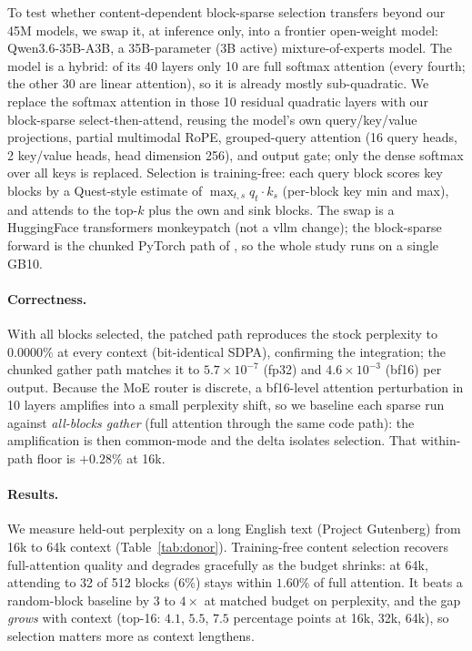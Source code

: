 \documentclass[10pt,letterpaper]{article}
\begin{document}
To test whether content-dependent block-sparse selection transfers beyond our 45M
models, we swap it, at inference only, into a frontier open-weight model:
Qwen3.6-35B-A3B, a 35B-parameter (3B active) mixture-of-experts model. The model is
a hybrid: of its 40 layers only 10 are full softmax attention (every fourth; the
other 30 are linear attention), so it is already mostly sub-quadratic. We replace
the softmax attention in those 10 residual quadratic layers with our block-sparse
select-then-attend, reusing the model's own query/key/value projections, partial
multimodal RoPE, grouped-query attention (16 query heads, 2 key/value heads, head
dimension 256), and output gate; only the dense softmax over all keys is replaced.
Selection is training-free: each query block scores key blocks by a Quest-style
\cite{tang2024quest} estimate of $\max_{t,s} q_t \cdot k_s$ (per-block key min and
max), and attends to the top-$k$ plus the own and sink blocks. The swap is a
HuggingFace transformers monkeypatch (not a vllm change); the block-sparse forward
is the chunked PyTorch path of , so the whole study runs on a
single GB10.

\paragraph{Correctness.} With all blocks selected, the patched path reproduces the
stock perplexity to $0.0000\%$ at every context (bit-identical SDPA), confirming the
integration; the chunked gather path matches it to $5.7\times10^{-7}$ (fp32) and
$4.6\times10^{-3}$ (bf16) per output. Because the MoE router is discrete, a
bf16-level attention perturbation in 10 layers amplifies into a small perplexity
shift, so we baseline each sparse run against \emph{all-blocks gather} (full
attention through the same code path): the amplification is then common-mode and the
delta isolates selection. That within-path floor is $+0.28\%$ at 16k.

\paragraph{Results.} We measure held-out perplexity on a long English text (Project
Gutenberg) from 16k to 64k context (Table~\ref{tab:donor}). Training-free content
selection recovers full-attention quality and degrades gracefully as the budget
shrinks: at 64k, attending to 32 of 512 blocks (6\%) stays within $1.60\%$ of full
attention. It beats a random-block baseline by $3$ to $4\times$ at matched budget on
perplexity,
and the gap \emph{grows} with context (top-16: $4.1$, $5.5$, $7.5$ percentage points
at 16k, 32k, 64k), so selection matters more as context lengthens.
\end{document}
